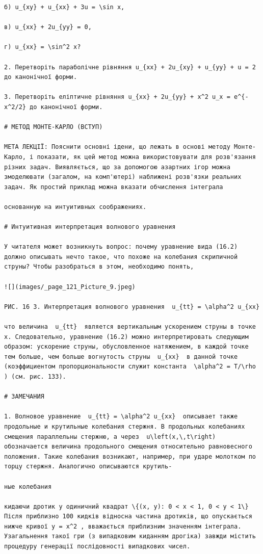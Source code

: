 \documentclass[
  ukrainian,
]{article}
\begin{document}
\begin{verbatim}
б) u_{xy} + u_{xx} + 3u = \sin x,

в) u_{xx} + 2u_{yy} = 0,

г) u_{xx} = \sin^2 x?

2. Перетворіть параболічне рівняння u_{xx} + 2u_{xy} + u_{yy} + u = 2 до канонічної форми.

3. Перетворіть еліптичне рівняння u_{xx} + 2u_{yy} + x^2 u_x = e^{-x^2/2} до канонічної форми.

# МЕТОД МОНТЕ-КАРЛО (ВСТУП)

МЕТА ЛЕКЦІЇ: Пояснити основні ідени, що лежать в основі методу Монте-Карло, і показати, як цей метод можна використовувати для розв'язання різних задач. Виявляється, що за допомогою азартних ігор можна змоделювати (загалом, на комп'ютері) наближені розв'язки реальних задач. Як простий приклад можна вказати обчислення інтеграла

основанную на интуитивных соображениях.

# Интуитивная интерпретация волнового уравнения

У читателя может возникнуть вопрос: почему уравнение вида (16.2) должно описывать нечто такое, что похоже на колебания скрипичной струны? Чтобы разобраться в этом, необходимо понять,

![](images/_page_121_Picture_9.jpeg)

РИС. 16 3. Интерпретация волнового уравнения  u_{tt} = \alpha^2 u_{xx} 

что величина  u_{tt}  является вертикальным ускорением струны в точке x. Следовательно, уравнение (16.2) можно интерпретировать следующим образом: ускорение струны, обусловленное натяжением, в каждой точке тем больше, чем больше вогнутость струны  u_{xx}  в данной точке (коэффициентом пропорциональности служит константа  \alpha^2 = T/\rho ) (см. рис. 133).

# ЗАМЕЧАНИЯ

1. Волновое уравнение  u_{tt} = \alpha^2 u_{xx}  описывает также продольные и крутильные колебания стержня. В продольных колебаниях смещения параллельны стержню, а через  u\left(x,\,t\right)  обозначается величина продольного смещения относительно равновесного положения. Такие колебания возникают, например, при ударе молотком по торцу стержня. Аналогично описываются крутиль-

ные колебания

кидаючи дротик у одиничний квадрат \{(x, y): 0 < x < 1, 0 < y < 1\} Після приблизно 100 кидків відносна частина дротиків, що опускається нижче кривої y = x^2 , вважається приблизним значенням інтеграла. Узагальнення такої гри (з випадковим киданням дрогіка) завжди містить процедуру генерації послідовності випадкових чисел.


\end{verbatim}
\end{document}
